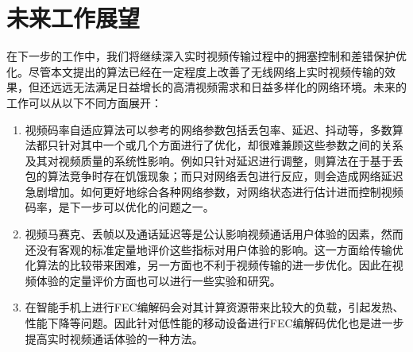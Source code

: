 \section{未来工作展望}
在下一步的工作中，我们将继续深入实时视频传输过程中的拥塞控制和差错保护优化。尽管本文提出的算法已经在一定程度上改善了无线网络上实时视频传输的效果，但还远远无法满足日益增长的高清视频需求和日益多样化的网络环境。未来的工作可以从以下不同方面展开：
\begin{enumerate}
    \item 视频码率自适应算法可以参考的网络参数包括丢包率、延迟、抖动等，多数算法都只针对其中一个或几个方面进行了优化，却很难兼顾这些参数之间的关系及其对视频质量的系统性影响。例如只针对延迟进行调整，则算法在于基于丢包的算法竞争时存在饥饿现象；而只对网络丢包进行反应，则会造成网络延迟急剧增加。如何更好地综合各种网络参数，对网络状态进行估计进而控制视频码率，是下一步可以优化的问题之一。
    \item 视频马赛克、丢帧以及通话延迟等是公认影响视频通话用户体验的因素，然而还没有客观的标准定量地评价这些指标对用户体验的影响。这一方面给传输优化算法的比较带来困难，另一方面也不利于视频传输的进一步优化。因此在视频体验的定量评价方面也可以进行一些实验和研究。
    \item 在智能手机上进行FEC编解码会对其计算资源带来比较大的负载，引起发热、性能下降等问题。因此针对低性能的移动设备进行FEC编解码优化也是进一步提高实时视频通话体验的一种方法。
\end{enumerate}
